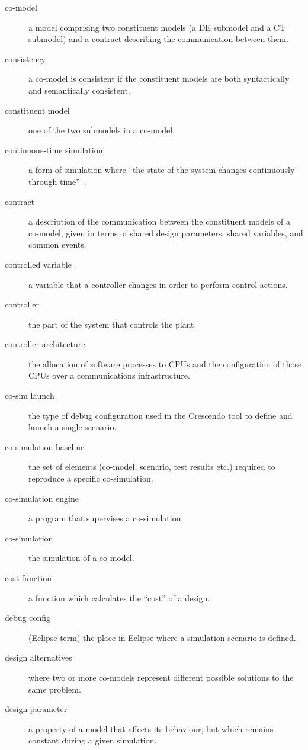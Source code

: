 \documentclass{crescendorepchap}
\begin{document}
\begin{description}
\item[co-model] a model comprising two constituent models (a DE submodel and a CT submodel) and a contract describing the communication between them.
\item[consistency] a co-model is consistent if the constituent models are both syntactically and semantically consistent.
\item[constituent model] one of the two submodels in a co-model.
\item[continuous-time simulation] a form of simulation where ``the state of the system changes continuously through time''~\cite[p.~15]{Robinson04}.
\item[contract] a description of the communication between the constituent models of a co-model, given in terms of shared design parameters, shared variables, and common events.
\item[controlled variable] a variable that a controller changes in order to perform control actions.
\item[controller] the part of the system that controls the plant.
\item[controller architecture] the allocation of software processes to CPUs and the configuration of those CPUs over a communications infrastructure.
\item[co-sim launch] the type of debug configuration used in the Crescendo tool to define and launch a single scenario.
\item[co-simulation baseline] the set of elements (co-model, scenario, test results etc.) required to reproduce a specific co-simulation.
\item[co-simulation engine] a program that supervises a co-simulation.
\item[co-simulation] the simulation of a co-model.
\item[cost function] a function which calculates the ``cost'' of a design.
\item[debug config] (Eclipse term) the place in Eclipse where a simulation scenario is defined.
\item[design alternatives] where two or more co-models represent different possible solutions to the same problem.
\item[design parameter] a property of a model that affects its behaviour, but which remains constant during a given simulation.

\end{description}
\end{document}
